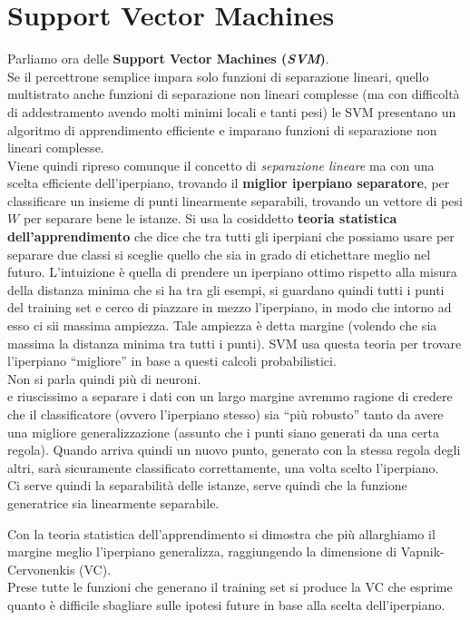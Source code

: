 \chapter{Support Vector Machines}
Parliamo ora delle \textbf{Support Vector Machines (\textit{SVM})}.\\
Se il percettrone semplice impara solo funzioni di separazione lineari, quello
multistrato anche funzioni di separazione non lineari complesse (ma con
difficoltà di addestramento avendo molti minimi locali e tanti pesi) le SVM
presentano un algoritmo di apprendimento efficiente e imparano funzioni di
separazione non lineari complesse.\\
Viene quindi ripreso comunque il concetto di \textit{separazione lineare} ma con
una scelta efficiente dell'iperpiano, trovando il \textbf{miglior iperpiano
  separatore}, per classificare un insieme di punti linearmente separabili,
trovando un vettore di pesi $W$ per separare bene le istanze. Si usa la
cosiddetto \textbf{teoria statistica dell’apprendimento} che dice che tra tutti
gli iperpiani che possiamo usare per separare due classi si sceglie quello che
sia in grado di etichettare meglio nel futuro. L'intuizione è quella di prendere
un iperpiano ottimo rispetto alla misura della distanza minima che si ha tra gli
esempi, si guardano quindi tutti i punti del training set e cerco di piazzare in
mezzo l'iperpiano, in modo che intorno ad esso ci sii massima ampiezza. Tale
ampiezza è detta margine (volendo che sia massima la distanza minima tra tutti i
punti). SVM usa questa teoria per trovare l'iperpiano ``migliore'' in base a
questi calcoli probabilistici. \\
Non si parla quindi più di neuroni.\\
e riuscissimo a separare i dati con un largo margine
avremmo ragione di credere che il classificatore (ovvero l'iperpiano stesso) sia
``più robusto'' tanto da avere una migliore generalizzazione (assunto che i
punti siano generati da una certa regola).
Quando arriva quindi un nuovo punto, generato con la stessa regola degli altri,
sarà sicuramente classificato correttamente, una volta scelto l'iperpiano.\\
Ci serve quindi la separabilità delle istanze, serve quindi che la funzione
generatrice sia linearmente separabile.
\begin{definizione}
  Con la teoria statistica dell'apprendimento si dimostra che più allarghiamo il
  margine meglio l’iperpiano generalizza, raggiungendo la dimensione di
  Vapnik-Cervonenkis (VC).\\
  Prese tutte le funzioni che generano il training set si produce la VC che
  esprime quanto è difficile sbagliare sulle ipotesi future in base alla scelta
  dell'iperpiano.
\end{definizione}

